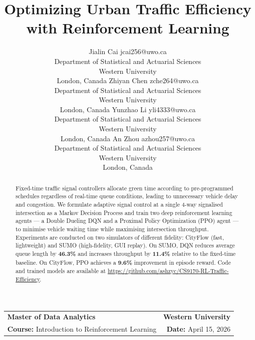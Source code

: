 \documentclass[twoside,11pt]{article}
\makeatletter
\newcommand{\reportheading}{
    \noindent
    \begin{tabular*}{\textwidth}{l @{\extracolsep{\fill}} r}
        \textbf{Master of Data Analytics} & \textbf{Western University} \\
        \textbf{Course:} Introduction to Reinforcement Learning & \textbf{Date:} April 15, 2026 \\
        \hline
    \end{tabular*}
    \vspace{0.5cm}
}
\makeatother
\begin{document}
\reportheading

\title{Optimizing Urban Traffic Efficiency with Reinforcement Learning}

\author{
\name Jialin Cai \email jcai256@uwo.ca \\
\addr Department of Statistical and Actuarial Sciences \\
Western University \\
London, Canada
\AND
\name Zhiyan Chen \email zche264@uwo.ca \\
\addr Department of Statistical and Actuarial Sciences \\
Western University \\
London, Canada
\AND
\name Yunzhao Li \email yli4333@uwo.ca \\
\addr Department of Statistical and Actuarial Sciences \\
Western University \\
London, Canada
\AND
\name An Zhou \email azhou257@uwo.ca \\
\addr Department of Statistical and Actuarial Sciences \\
Western University \\
London, Canada
}

\editor{}
\maketitle

\begin{abstract}
Fixed-time traffic signal controllers allocate green time according to
pre-programmed schedules regardless of real-time queue conditions, leading to
unnecessary vehicle delay and congestion.  We formulate adaptive signal control
at a single 4-way signalised intersection as a Markov Decision Process and
train two deep reinforcement learning agents — a Double Dueling DQN and a
Proximal Policy Optimization (PPO) agent — to minimise vehicle waiting time
while maximising intersection throughput.  Experiments are conducted on two
simulators of different fidelity: CityFlow (fast, lightweight) and SUMO
(high-fidelity, GUI replay).  On SUMO, DQN reduces average queue length by
\textbf{46.3\%} and increases throughput by \textbf{11.4\%} relative to
the fixed-time baseline.  On CityFlow, PPO achieves a \textbf{9.6\%}
improvement in episode reward.  Code and trained models are available at
\url{https://github.com/ashzyc/CS9170-RL-Traffic-Efficiency}.
\end{abstract}
\end{document}
